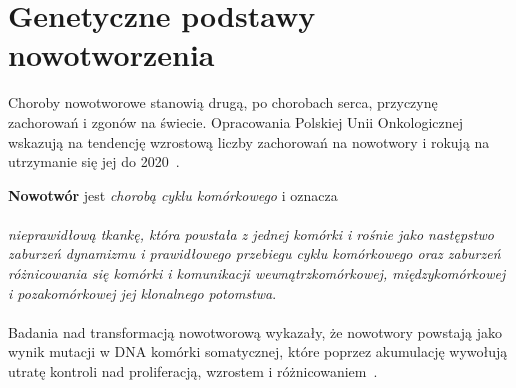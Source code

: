 \section{Genetyczne podstawy nowotworzenia}\label{cha:gen}
Choroby nowotworowe stanowią drugą, po chorobach serca, przyczynę zachorowań i zgonów na świecie. Opracowania Polskiej Unii Onkologicznej wskazują na tendencję wzrostową liczby zachorowań na nowotwory i rokują na utrzymanie się jej do 2020~\citep{zikula}.

\textbf{Nowotwór} jest \textit{chorobą cyklu komórkowego} i oznacza \citep{zikula2} \\ \ \\ \textit{nieprawidłową tkankę, która powstała z jednej komórki i rośnie jako następstwo zaburzeń dynamizmu i prawidłowego przebiegu cyklu komórkowego oraz zaburzeń różnicowania się komórki i komunikacji wewnątrzkomórkowej, międzykomórkowej i pozakomórkowej jej klonalnego potomstwa}. \\ \ \\
Badania nad transformacją nowotworową wykazały, że nowotwory powstają jako wynik mutacji w DNA komórki somatycznej, które poprzez akumulację wywołują utratę kontroli nad proliferacją, wzrostem i różnicowaniem~\citep{zikula5}.

